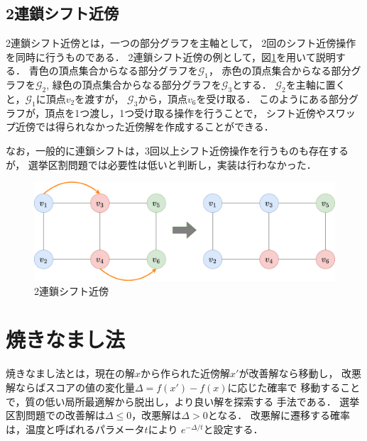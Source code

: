 \subsection{2連鎖シフト近傍}

2連鎖シフト近傍とは，一つの部分グラフを主軸として，
2回のシフト近傍操作を同時に行うものである．
2連鎖シフト近傍の例として，図\ref{chain-neighbor}を用いて説明する．
青色の頂点集合からなる部分グラフを$\mathcal{G}_1$，
赤色の頂点集合からなる部分グラフを$\mathcal{G}_2$,
緑色の頂点集合からなる部分グラフを$\mathcal{G}_3$とする．
$\mathcal{G}_2$を主軸に置くと，$\mathcal{G}_1$に頂点$v_2$を渡すが，
$\mathcal{G}_3$から，頂点$v_6$を受け取る．
このようにある部分グラフが，頂点を1つ渡し，1つ受け取る操作を行うことで，
シフト近傍やスワップ近傍では得られなかった近傍解を作成することができる．

なお，一般的に連鎖シフトは，3回以上シフト近傍操作を行うものも存在するが，
選挙区割問題では必要性は低いと判断し，実装は行わなかった．

\begin{figure}[htbp]
  \centering
  \includegraphics[scale=0.2]{img/chain-neighbor.png}
  \caption{2連鎖シフト近傍}
  \label{chain-neighbor}
\end{figure}

\section{焼きなまし法}

焼きなまし法とは，現在の解$x$から作られた近傍解$x'$が改善解なら移動し，
改悪解ならばスコアの値の変化量$\Delta=f(x')-f(x)$に応じた確率で
移動することで，質の低い局所最適解から脱出し，より良い解を探索する
手法である\cite{umetani}．
選挙区割問題での改善解は$\Delta \leq 0$，改悪解は$\Delta > 0$となる．
改悪解に遷移する確率は，温度と呼ばれるパラメータ$t$により
$e^{-\Delta/t}$と設定する．

